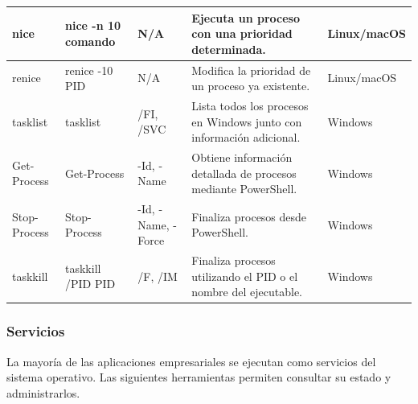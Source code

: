 \documentclass[a4paper,10pt]{article}
\begin{document}
\begin{longtable}{|p{2.8cm}|p{3.2cm}|p{4cm}|p{5.4cm}|p{1.5cm}|}
nice &
nice -n 10 comando &
N/A &
Ejecuta un proceso con una prioridad determinada. &
Linux/macOS
\\
\hline

renice &
renice -10 PID &
N/A &
Modifica la prioridad de un proceso ya existente. &
Linux/macOS
\\
\hline

tasklist &
tasklist &
/FI, /SVC &
Lista todos los procesos en Windows junto con información adicional. &
Windows
\\
\hline

Get-Process &
Get-Process &
-Id, -Name &
Obtiene información detallada de procesos mediante PowerShell. &
Windows
\\
\hline

Stop-Process &
Stop-Process &
-Id, -Name, -Force &
Finaliza procesos desde PowerShell. &
Windows
\\
\hline

taskkill &
taskkill /PID PID &
/F, /IM &
Finaliza procesos utilizando el PID o el nombre del ejecutable. &
Windows
\\
\hline

\end{longtable}


\subsubsection{Servicios}

La mayoría de las aplicaciones empresariales se ejecutan como servicios del
sistema operativo. Las siguientes herramientas permiten consultar su estado y
administrarlos.
\end{document}

